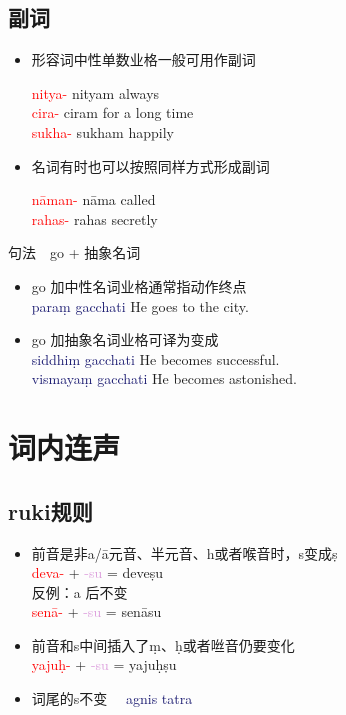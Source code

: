 \documentclass[17pt]{beamer}
\newcommand{\nounstem}[1]{\textcolor{red}{#1\nobreakdash-}}
\newcommand{\fullpada}[1]{\textcolor{OliveGreen}{#1}}
\newcommand{\pratyaya}[1]{\textcolor{Plum}{#1}}
\newcommand{\fullsentence}[1]{\textcolor{MidnightBlue}{#1}}
\begin{document}
\subsection{副词}
\begin{frame}{\insertsubsection }
  \small
  \begin{itemize}
    \item 形容词中性单数业格一般可用作副词
    
    \nounstem{nitya} \fullpada{nityam} always \\
    \nounstem{cira} \fullpada{ciram} for a long time \\
    \nounstem{sukha} \fullpada{sukham} happily
    \item 名词有时也可以按照同样方式形成副词
    
    \nounstem{nāman} \fullpada{nāma} called \\
    \nounstem{rahas} \fullpada{rahas} secretly
  \end{itemize}
\end{frame}

\begin{frame}{句法~~go + 抽象名词}
  \small
  \begin{itemize}
    \item go 加中性名词业格通常指动作终点\\     
    \fullsentence{paraṃ gacchati}  He goes to the city. 
    \item go 加抽象名词业格可译为变成 \\
    \fullsentence{siddhiṃ gacchati}  He becomes successful. \\
    \fullsentence{vismayaṃ gacchati}  He becomes astonished. 
  \end{itemize}  
\end{frame}

\section{词内连声}
\begin{frame}{\insertsection }
  \small
  \tableofcontents[currentsection]
\end{frame}

\subsection{ruki规则}
\small
\begin{frame}{\insertsubsection }
  \begin{itemize}
    \item 前音是非a/ā元音、半元音、h或者喉音时，s变成ṣ\\
    \nounstem{deva} + \pratyaya{\nobreakdash-su} = \fullpada{deveṣu}\\
    反例：a 后不变 \\ \nounstem{senā} + \pratyaya{\nobreakdash-su} = \fullpada{senāsu}
    \item 前音和s中间插入了ṃ、ḥ或者咝音仍要变化\\
    \nounstem{yajuḥ} + \pratyaya{\nobreakdash-su} = \fullpada{yajuḥṣu}
    \item 词尾的s不变 
    ~~\fullsentence{agnis tatra} 
  \end{itemize}
\end{frame}
\end{document}
